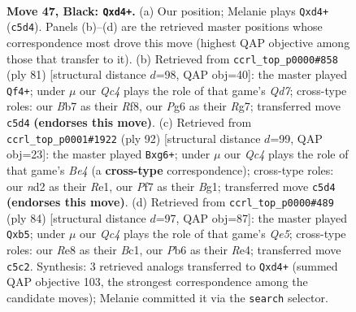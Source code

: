 \documentclass[11pt]{article}
\begin{document}
\clearpage

\begin{figure}[p]\centering
\begin{subfigure}{0.46\textwidth}\centering
\resizebox{\linewidth}{!}{%
\newchessgame
\chessboard[
  setfen={1r2r3/Rb3p1k/1p4p1/2q5/3B3P/1P3Q2/2PN4/R2B2K1 b - - 8 47},
  showmover=false,
  pgfstyle=straightmove, color=movearrow, markmove={c5-d4}
]}
\caption{}
\end{subfigure}\hfill
\begin{subfigure}{0.46\textwidth}\centering
\resizebox{\linewidth}{!}{%
\newchessgame
\chessboard[
  setfen={5rk1/6r1/p3p3/1p2Pp2/8/1P6/P2qQK2/1BR3R1 b - - 7 41},
  showmover=false,
  pgfstyle=straightmove, color=movearrow, markmove={d2-f4}
]}
\caption{}
\end{subfigure}
\\[4pt]
\begin{subfigure}{0.46\textwidth}\centering
\resizebox{\linewidth}{!}{%
\newchessgame
\chessboard[
  setfen={5Q2/p2qr1pk/P5b1/2pPb3/4Bp2/7P/6P1/4R1BK w - - 9 47},
  showmover=false,
  pgfstyle=straightmove, color=movearrow, markmove={e4-g6}
]}
\caption{}
\end{subfigure}\hfill
\begin{subfigure}{0.46\textwidth}\centering
\resizebox{\linewidth}{!}{%
\newchessgame
\chessboard[
  setfen={3qr3/2r4k/3bn1p1/1p2Q3/2ppR3/3P3B/5P2/R1B3K1 w - - 0 43},
  showmover=false,
  pgfstyle=straightmove, color=movearrow, markmove={e5-b5}
]}
\caption{}
\end{subfigure}
\caption{\textbf{Move 47, Black: \texttt{Qxd4+}.} (a) Our position; Melanie plays \texttt{Qxd4+} (\texttt{c5d4}). Panels (b)--(d) are the retrieved master positions whose correspondence most drove this move (highest QAP objective among those that transfer to it). (b) Retrieved from \texttt{ccrl\_top\_p0000\#858} (ply 81) [structural distance $d$=98, QAP obj=40]: the master played \texttt{Qf4+}; under $\mu$ our \emph{Qc4} plays the role of that game's \emph{Qd7}; cross-type roles: our \emph{B}b7 as their \emph{R}f8, our \emph{P}g6 as their \emph{R}g7; transferred move \texttt{c5d4} \textbf{(endorses this move)}. (c) Retrieved from \texttt{ccrl\_top\_p0001\#1922} (ply 92) [structural distance $d$=99, QAP obj=23]: the master played \texttt{Bxg6+}; under $\mu$ our \emph{Qc4} plays the role of that game's \emph{Be4} (a \textbf{cross-type} correspondence); cross-type roles: our \emph{n}d2 as their \emph{R}e1, our \emph{P}f7 as their \emph{B}g1; transferred move \texttt{c5d4} \textbf{(endorses this move)}. (d) Retrieved from \texttt{ccrl\_top\_p0000\#489} (ply 84) [structural distance $d$=97, QAP obj=87]: the master played \texttt{Qxb5}; under $\mu$ our \emph{Qc4} plays the role of that game's \emph{Qe5}; cross-type roles: our \emph{R}e8 as their \emph{B}c1, our \emph{P}b6 as their \emph{R}e4; transferred move \texttt{c5c2}. Synthesis: 3 retrieved analogs transferred to \texttt{Qxd4+} (summed QAP objective 103, the strongest correspondence among the candidate moves); Melanie committed it via the \texttt{search} selector.}
\label{fig:thought-m93}
\end{figure}
\end{document}
